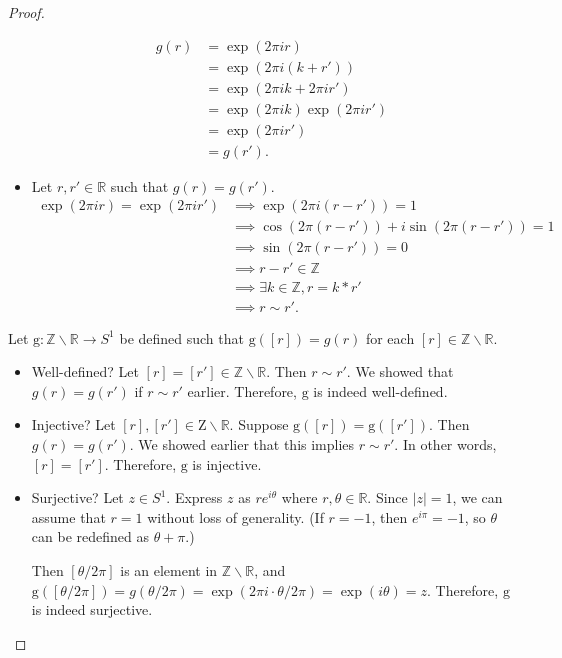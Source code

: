 \documentclass[12pt, psamsfonts]{amsart}
\theoremstyle{definition}
\theoremstyle{remark}
\numberwithin{equation}{section}
\begin{document}
\begin{proof}
\begin{itemize}
      \begin{align*}
        g(r)
          &= \exp(2\pi i r) \\
          &= \exp(2\pi i (k + r')) \\
          &= \exp(2\pi i k + 2\pi i r') \\
          &= \exp(2\pi i k)\exp(2\pi i r') \\
          &= \exp(2\pi i r') \\
          &= g(r').
      \end{align*}
    \item
      Let $r, r' \in \mathbb{R}$ such that $g(r) = g(r')$.
      \begin{align*}
        \exp(2\pi ir) = \exp(2 \pi ir')
          &\implies \exp(2\pi i(r - r')) = 1 \\
          &\implies \cos(2\pi (r - r')) + i\sin (2\pi (r - r')) = 1 \\
          &\implies \sin (2\pi (r - r')) = 0 \\
          &\implies r - r' \in \mathbb{Z} \\
          &\implies \exists k \in \mathbb{Z},  r = k * r' \\
          &\implies r \sim r'.
      \end{align*}
  \end{itemize}
  Let $\mathrm{g}: \mathbb{Z} \backslash \mathbb{R} \rightarrow S^1$ be defined such that $\mathrm{g}([r]) = g(r)$ for each $[r] \in \mathbb{Z} \backslash \mathbb{R}$.
  \begin{itemize}
    \item
      Well-defined?
      Let $[r] = [r'] \in \mathbb{Z} \backslash \mathbb{R}$.
      Then $r \sim r'$.
      We showed that $g(r) = g(r')$ if $r \sim r'$ earlier.
      Therefore, $\mathrm{g}$ is indeed well-defined.
    \item
      Injective?
      Let $[r], [r'] \in \mathrm{Z} \backslash \mathbb{R}$.
      Suppose $\mathrm{g}([r]) = \mathrm{g}([r'])$.
      Then $g(r) = g(r')$.
      We showed earlier that this implies $r \sim r'$.
      In other words, $[r] = [r']$.
      Therefore, $\mathrm{g}$ is injective.
    \item
      Surjective?
      Let $z \in S^1$.
      Express $z$ as $re^{i\theta}$ where $r, \theta \in \mathbb{R}$.
      Since $\lvert z \rvert = 1$, we can assume that $r = 1$ without loss of generality.  (If $r = -1$, then $e^{i\pi} = -1$, so $\theta$ can be redefined as $\theta + \pi$.)

      Then $[\theta / 2\pi]$ is an element in $\mathbb{Z} \backslash \mathbb{R}$, and $\mathrm{g}([\theta / 2\pi]) = g(\theta / 2\pi) = \exp(2\pi i \cdot \theta / 2\pi) = \exp(i\theta) = z$.
      Therefore, $\mathrm{g}$ is indeed surjective.
  \end{itemize}
\end{proof}
\end{document}
